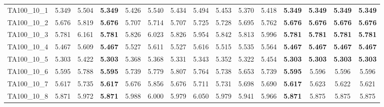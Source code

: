 \begin{tabular}{cc||ccccccccccccc}
TA100\_10\_1       & 5.349            & 5.504            & {\bf 5.349}      & 5.426            & 5.540            & 5.434            & 5.494            & 5.453            & 5.370            & 5.418            & {\bf 5.349}      & {\bf 5.349}      & {\bf 5.349}      & {\bf 5.349}     \\ 
TA100\_10\_2       & 5.676            & 5.819            & {\bf 5.676}      & 5.707            & 5.714            & 5.707            & 5.725            & 5.728            & 5.695            & 5.762            & {\bf 5.676}      & {\bf 5.676}      & {\bf 5.676}      & {\bf 5.676}     \\ 
TA100\_10\_3       & 5.781            & 6.161            & {\bf 5.781}      & 5.826            & 6.023            & 5.826            & 5.954            & 5.842            & 5.813            & 5.996            & {\bf 5.781}      & {\bf 5.781}      & {\bf 5.781}      & {\bf 5.781}     \\ 
TA100\_10\_4       & 5.467            & 5.609            & {\bf 5.467}      & 5.527            & 5.611            & 5.527            & 5.616            & 5.515            & 5.535            & 5.564            & {\bf 5.467}      & {\bf 5.467}      & {\bf 5.467}      & {\bf 5.467}     \\ 
TA100\_10\_5       & 5.303            & 5.422            & {\bf 5.303}      & 5.368            & 5.368            & 5.331            & 5.343            & 5.352            & 5.322            & 5.454            & {\bf 5.303}      & {\bf 5.303}      & {\bf 5.303}      & {\bf 5.303}     \\ 
TA100\_10\_6       & 5.595            & 5.788            & {\bf 5.595}      & 5.739            & 5.779            & 5.807            & 5.764            & 5.738            & 5.653            & 5.739            & {\bf 5.595}      & 5.596            & 5.596            & 5.596           \\ 
TA100\_10\_7       & 5.617            & 5.735            & {\bf 5.617}      & 5.676            & 5.856            & 5.676            & 5.711            & 5.731            & 5.698            & 5.690            & {\bf 5.617}      & 5.623            & 5.622            & 5.621           \\ 
TA100\_10\_8       & 5.871            & 5.972            & {\bf 5.871}      & 5.988            & 6.000            & 5.979            & 6.050            & 5.979            & 5.941            & 5.966            & {\bf 5.871}      & 5.875            & 5.875            & 5.875           \\ 

\end{tabular}
